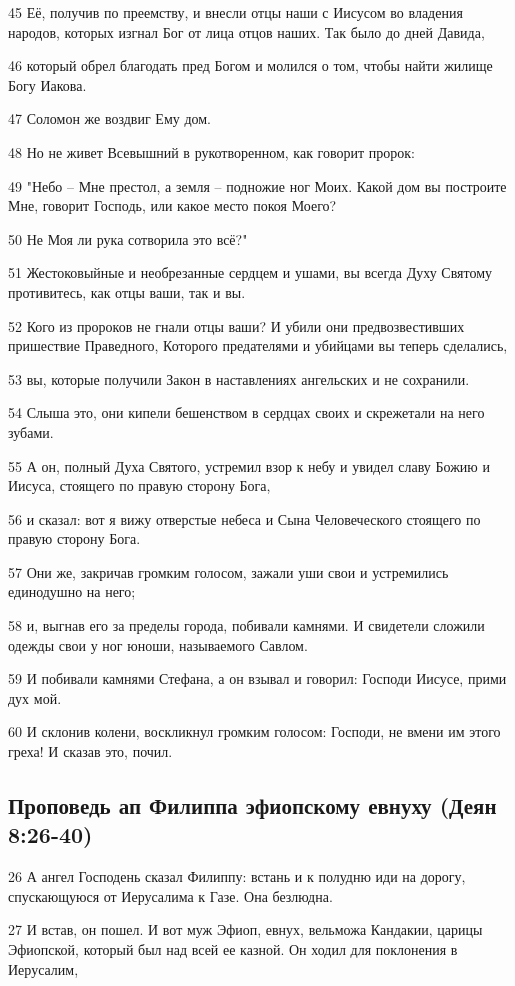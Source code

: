 45 Её, получив по преемству, и внесли отцы наши с Иисусом во владения народов, которых изгнал Бог от лица отцов наших. Так было до дней Давида,

46 который обрел благодать пред Богом и молился о том, чтобы найти жилище Богу Иакова.

47 Соломон же воздвиг Ему дом.

48 Но не живет Всевышний в рукотворенном, как говорит пророк:

49 "Небо – Мне престол, а земля – подножие ног Моих. Какой дом вы построите Мне, говорит Господь, или какое место покоя Моего?

50 Не Моя ли рука сотворила это всё?"

51 Жестоковыйные и необрезанные сердцем и ушами, вы всегда Духу Святому противитесь, как отцы ваши, так и вы.

52 Кого из пророков не гнали отцы ваши? И убили они предвозвестивших пришествие Праведного, Которого предателями и убийцами вы теперь сделались,

53 вы, которые получили Закон в наставлениях ангельских и не сохранили.

54 Слыша это, они кипели бешенством в сердцах своих и скрежетали на него зубами.

55 А он, полный Духа Святого, устремил взор к небу и увидел славу Божию и Иисуса, стоящего по правую сторону Бога,

56 и сказал: вот я вижу отверстые небеса и Сына Человеческого стоящего по правую сторону Бога.

57 Они же, закричав громким голосом, зажали уши свои и устремились единодушно на него;

58 и, выгнав его за пределы города, побивали камнями. И свидетели сложили одежды свои у ног юноши, называемого Савлом.

59 И побивали камнями Стефана, а он взывал и говорил: Господи Иисусе, прими дух мой.

60 И склонив колени, воскликнул громким голосом: Господи, не вмени им этого греха! И сказав это, почил.

\subsection*{Проповедь ап Филиппа эфиопскому евнуху (Деян 8:26-40)}
26 А ангел Господень сказал Филиппу: встань и к полудню иди на дорогу, спускающуюся от Иерусалима к Газе. Она безлюдна.

27 И встав, он пошел. И вот муж Эфиоп, евнух, вельможа Кандакии, царицы Эфиопской, который был над всей ее казной. Он ходил для поклонения в Иерусалим,

